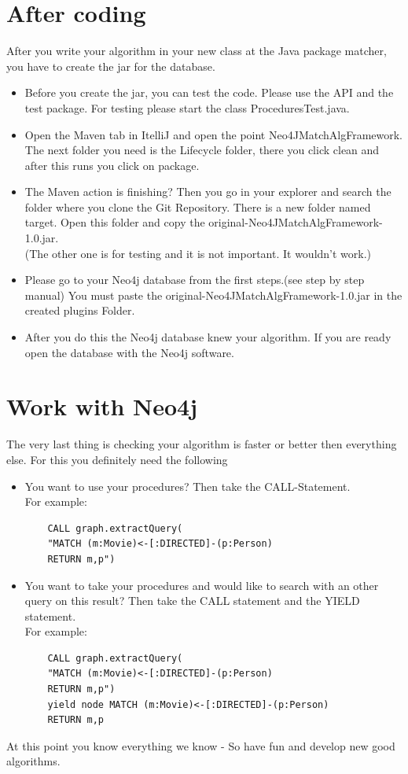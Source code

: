 \section{After coding}\label{sec:afterProgramming}
After you write your algorithm in your new class at the Java package matcher, you have to create the \glqq jar \grqq{} for the database.
\begin{itemize}
	\item Before you create the jar, you can test the code. Please use the API and the test package. For testing please start the class \glqq ProceduresTest.java\grqq{}.
	\item Open the Maven tab in \glqq ItelliJ \grqq{} and open the point \glqq Neo4JMatchAlgFramework\grqq{}. The next folder you need is the \glqq Lifecycle\grqq{} folder, there you click \glqq clean\grqq{} and after this runs you click on \glqq package\grqq{}.
	\item The Maven action is finishing? Then you go in your explorer and search the folder where you clone the \glqq Git Repository\grqq{}. There is a new folder named target. Open this \glqq folder\grqq{} and copy the \glqq original-Neo4JMatchAlgFramework-1.0.jar\grqq{}. \\
	(The other one is for testing and it is not important. It wouldn't work.)
	\item Please go to your Neo4j database from the first steps.(see step by step manual) You must paste the \glqq original-Neo4JMatchAlgFramework-1.0.jar\grqq{} in the created \glqq plugins\grqq{} Folder.
	\item After you do this the Neo4j database knew your algorithm. If you are ready open the database with the Neo4j software.
\end{itemize}

\section{Work with Neo4j}\label{sec:takeneo4j}
The very last thing is checking your algorithm is faster or better then everything else.
For this you definitely need the following
\newpage
\begin{itemize}
	\item You want to use your procedures? Then take the CALL-Statement.\\
	For example:
	\begin{lstlisting}
	CALL graph.extractQuery(
	"MATCH (m:Movie)<-[:DIRECTED]-(p:Person) 
	RETURN m,p")
	\end{lstlisting}
	\item You want to take your procedures and would like to search with an other query on this result? Then take the CALL statement and the YIELD statement. \\
	For example:
	
	\begin{lstlisting}
	CALL graph.extractQuery(
	"MATCH (m:Movie)<-[:DIRECTED]-(p:Person)
	RETURN m,p") 
	yield node MATCH (m:Movie)<-[:DIRECTED]-(p:Person)
	RETURN m,p
	\end{lstlisting}
\end{itemize}
At this point you know everything we know - So have fun and develop new good algorithms.

